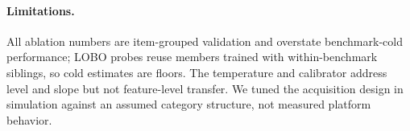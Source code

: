 \documentclass{article}
\begin{document}
\paragraph{Limitations.}
All ablation numbers are item-grouped validation and overstate benchmark-cold performance; LOBO probes reuse members trained with within-benchmark siblings, so cold estimates are floors. The temperature and calibrator address level and slope but not feature-level transfer. We tuned the acquisition design in simulation against an assumed category structure, not measured platform behavior.
\end{document}
